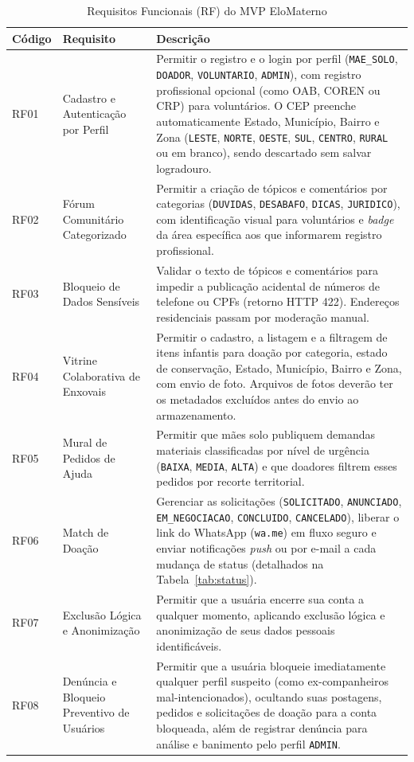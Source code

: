 \begin{table}[H]
\centering
\singlespacing
\caption{Requisitos Funcionais (RF) do MVP EloMaterno}
\label{tab:rf}
\small
\begin{tabular}{p{0.9cm}p{3.6cm}p{10.2cm}}
\toprule
\textbf{Código} & \textbf{Requisito} & \textbf{Descrição} \\
\midrule
RF01 & Cadastro e Autenticação por Perfil & Permitir o registro e o login por perfil (\texttt{MAE\_SOLO}, \texttt{DOADOR}, \texttt{VOLUNTARIO}, \texttt{ADMIN}), com registro profissional opcional (como OAB, COREN ou CRP) para voluntários. O CEP preenche automaticamente Estado, Município, Bairro e Zona (\texttt{LESTE}, \texttt{NORTE}, \texttt{OESTE}, \texttt{SUL}, \texttt{CENTRO}, \texttt{RURAL} ou em branco), sendo descartado sem salvar logradouro. \\
\addlinespace[3pt]
RF02 & Fórum Comunitário Categorizado & Permitir a criação de tópicos e comentários por categorias (\texttt{DUVIDAS}, \texttt{DESABAFO}, \texttt{DICAS}, \texttt{JURIDICO}), com identificação visual para voluntários e \textit{badge} da área específica aos que informarem registro profissional. \\
\addlinespace[3pt]
RF03 & Bloqueio de Dados Sensíveis & Validar o texto de tópicos e comentários para impedir a publicação acidental de números de telefone ou CPFs (retorno HTTP 422). Endereços residenciais passam por moderação manual. \\
\addlinespace[3pt]
RF04 & Vitrine Colaborativa de Enxovais & Permitir o cadastro, a listagem e a filtragem de itens infantis para doação por categoria, estado de conservação, Estado, Município, Bairro e Zona, com envio de foto. Arquivos de fotos deverão ter os metadados excluídos antes do envio ao armazenamento. \\
\addlinespace[3pt]
RF05 & Mural de Pedidos de Ajuda & Permitir que mães solo publiquem demandas materiais classificadas por nível de urgência (\texttt{BAIXA}, \texttt{MEDIA}, \texttt{ALTA}) e que doadores filtrem esses pedidos por recorte territorial. \\
\addlinespace[3pt]
RF06 & Match de Doação & Gerenciar as solicitações (\texttt{SOLICITADO}, \texttt{ANUNCIADO}, \texttt{EM\_NEGOCIACAO}, \texttt{CONCLUIDO}, \texttt{CANCELADO}), liberar o link do WhatsApp (\texttt{wa.me}) em fluxo seguro e enviar notificações \textit{push} ou por e-mail a cada mudança de status (detalhados na Tabela~\ref{tab:status}). \\
\addlinespace[3pt]
RF07 & Exclusão Lógica e Anonimização & Permitir que a usuária encerre sua conta a qualquer momento, aplicando exclusão lógica e anonimização de seus dados pessoais identificáveis. \\
\addlinespace[3pt]
RF08 & Denúncia e Bloqueio Preventivo de Usuários & Permitir que a usuária bloqueie imediatamente qualquer perfil suspeito (como ex-companheiros mal-intencionados), ocultando suas postagens, pedidos e solicitações de doação para a conta bloqueada, além de registrar denúncia para análise e banimento pelo perfil \texttt{ADMIN}. \\
\bottomrule
\end{tabular}
\vspace{0.1cm}


\end{table}
